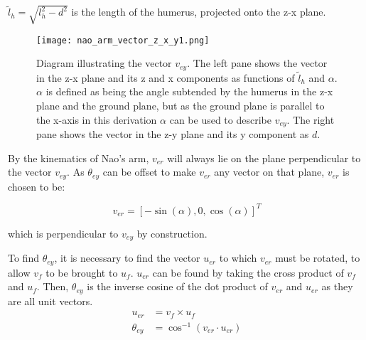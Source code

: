 $\tilde l_h = \sqrt{l_h^2 - d^2}$ is the length of the humerus, projected onto the z-x plane.

\begin{figure}
	\texttt{[image: nao\_arm\_vector\_z\_x\_y1.png]}
  	\caption{Diagram illustrating the vector $v_{ey}$. The left pane shows the vector in
  					 the z-x plane and its z and x components as functions of $\tilde l_h$ and $\alpha$.
  					 $\alpha$ is defined as being the angle subtended by the humerus in the z-x plane and the
  					 ground plane, but as the ground plane is parallel to the x-axis in this derivation
  					 $\alpha$ can be used to describe $v_{ey}$.
  					 The right pane shows the vector in the z-y plane and its y component as $d$.
  				  }
  	\label{fig:arm_vectors1}
\end{figure}

By the kinematics of Nao's arm, $v_{er}$ will always lie on the plane perpendicular to the vector $v_{ey}$.
As $\theta_{ey}$ can be offset to make $v_{er}$ any vector on that plane, $v_{er}$ is chosen to be:

\begin{equation}
	v_{er} = [-\sin(\alpha), 0, \cos(\alpha)]^T
\end{equation}

which is perpendicular to $v_{ey}$ by construction.


To find $\theta_{ey}$,  it is necessary to find the vector $u_{er}$ to which $v_{er}$ must be rotated, to allow
$v_f$ to be brought to $u_f$. $u_{er}$ can be found by taking the cross product of $v_f$ and $u_f$.
Then, $\theta_{ey}$ is the inverse cosine of the dot product of $v_{er}$ and $u_{er}$ as they are all unit vectors.
\begin{align}
	u_{er} &= v_f \times u_f \\
	\theta_{ey} &= \cos^{-1}(v_{er} \cdot u_{er})
\end{align}

